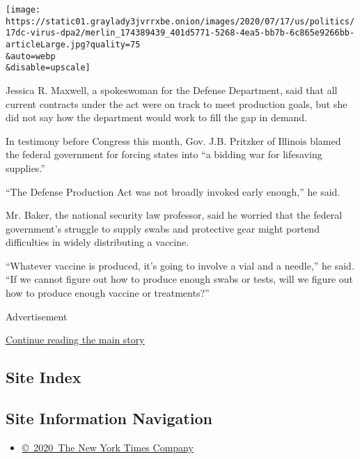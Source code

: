 \texttt{[image: https://static01.graylady3jvrrxbe.onion/images/2020/07/17/us/politics/17dc-virus-dpa2/merlin\_174389439\_401d5771-5268-4ea5-bb7b-6c865e9266bb-articleLarge.jpg?quality=75\\\&auto=webp\\\&disable=upscale]}

Jessica R. Maxwell, a spokeswoman for the Defense Department, said that
all current contracts under the act were on track to meet production
goals, but she did not say how the department would work to fill the gap
in demand.

In testimony before Congress this month, Gov. J.B. Pritzker of Illinois
blamed the federal government for forcing states into ``a bidding war
for lifesaving supplies.''

``The Defense Production Act was not broadly invoked early enough,'' he
said.

Mr. Baker, the national security law professor, said he worried that the
federal government's struggle to supply swabs and protective gear might
portend difficulties in widely distributing a vaccine.

``Whatever vaccine is produced, it's going to involve a vial and a
needle,'' he said. ``If we cannot figure out how to produce enough swabs
or tests, will we figure out how to produce enough vaccine or
treatments?''

Advertisement

\protect\hyperlink{after-bottom}{Continue reading the main story}

\hypertarget{site-index}{%
\subsection{Site Index}\label{site-index}}

\hypertarget{site-information-navigation}{%
\subsection{Site Information
Navigation}\label{site-information-navigation}}

\begin{itemize}
\tightlist
\item
  \href{https://help.nytimes3xbfgragh.onion/hc/en-us/articles/115014792127-Copyright-notice}{©~2020~The
  New York Times Company}
\end{itemize}

